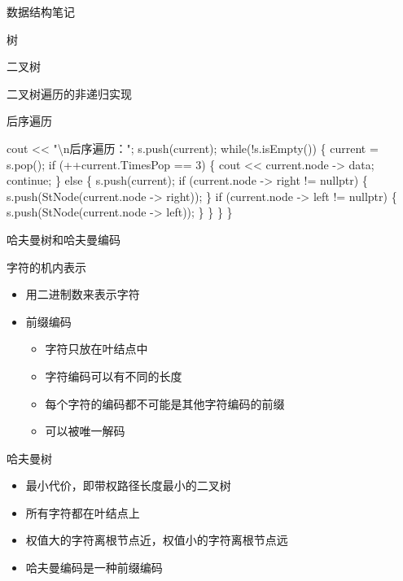 \documentclass[
  ignorenonframetext,
]{beamer}
\newenvironment{Shaded}{}{}
\newcommand{\NormalTok}[1]{#1}
\providecommand{\tightlist}{%
  \setlength{\itemsep}{0pt}\setlength{\parskip}{0pt}}
\begin{document}
\begin{frame}[fragile]{数据结构笔记}
\begin{block}{树}
\begin{block}{二叉树}
\begin{block}{二叉树遍历的非递归实现}
\begin{block}{后序遍历}
\begin{Shaded}
\begin{Highlighting}[]
\NormalTok{  cout \textless{}\textless{} "\textbackslash{}n后序遍历：";}
\NormalTok{  s.push(current);}
\NormalTok{  while(!s.isEmpty())}
\NormalTok{  \{}
\NormalTok{    current = s.pop();}
\NormalTok{    if (++current.TimesPop == 3)}
\NormalTok{    \{}
\NormalTok{      cout \textless{}\textless{} current.node {-}\textgreater{} data;}
\NormalTok{      continue; }
\NormalTok{    \}}
\NormalTok{    else}
\NormalTok{    \{}
\NormalTok{      s.push(current);}
\NormalTok{      if (current.node {-}\textgreater{} right != nullptr)}
\NormalTok{      \{}
\NormalTok{        s.push(StNode(current.node {-}\textgreater{} right));}
\NormalTok{      \}}
\NormalTok{      if (current.node {-}\textgreater{} left != nullptr)}
\NormalTok{      \{}
\NormalTok{        s.push(StNode(current.node {-}\textgreater{} left));}
\NormalTok{      \}}
\NormalTok{    \}}
\NormalTok{  \}}
\NormalTok{\}}
\end{Highlighting}
\end{Shaded}
\end{block}
\end{block}
\end{block}

\begin{block}{哈夫曼树和哈夫曼编码}
\protect{}\label{ux54c8ux592bux66fcux6811ux548cux54c8ux592bux66fcux7f16ux7801}
\begin{block}{字符的机内表示}
\protect{}\label{ux5b57ux7b26ux7684ux673aux5185ux8868ux793a}
\begin{itemize}
\tightlist
\item
  用二进制数来表示字符
\item
  前缀编码

  \begin{itemize}
  \tightlist
  \item
    字符只放在叶结点中
  \item
    字符编码可以有不同的长度
  \item
    每个字符的编码都不可能是其他字符编码的前缀
  \item
    可以被唯一解码
  \end{itemize}
\end{itemize}
\end{block}

\begin{block}{哈夫曼树}
\protect{}\label{ux54c8ux592bux66fcux6811}
\begin{itemize}
\tightlist
\item
  最小代价，即带权路径长度最小的二叉树
\item
  所有字符都在叶结点上
\item
  权值大的字符离根节点近，权值小的字符离根节点远
\item
  哈夫曼编码是一种前缀编码
\end{itemize}


\end{block}
\end{block}
\end{block}
\end{frame}
\end{document}
